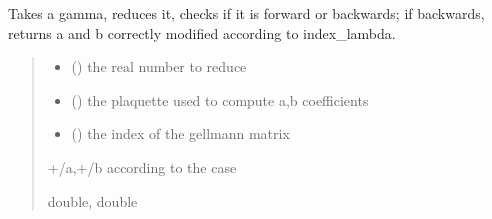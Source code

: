 \documentclass[letterpaper,10pt,english]{sphinxmanual}
\begin{document}

\begin{fulllineitems}
\label{\detokenize{analytical_reject:analytical_reject.coeffs_ana}}
\pysigstartsignatures
\pysiglinewithargsret
{}
{\sphinxparamcomma {}\sphinxparamcomma {}}
{}
\pysigstopsignatures
\sphinxAtStartPar
Takes a gamma, reduces it, checks if it is forward or backwards; if backwards, returns a and b correctly modified according to index\_lambda.
\begin{quote}\begin{description}
\begin{itemize}
\item {} 
\sphinxAtStartPar
{} () \textendash{} the real number to reduce

\item {} 
\sphinxAtStartPar
{} () \textendash{} the plaquette used to compute a,b coefficients

\item {} 
\sphinxAtStartPar
{} () \textendash{} the index of the gell\sphinxhyphen{}mann matrix

\end{itemize}

\sphinxAtStartPar
+/\sphinxhyphen{}a,+/\sphinxhyphen{}b according to the case

\sphinxAtStartPar
double, double

\end{description}\end{quote}

\end{fulllineitems}

\end{document}
